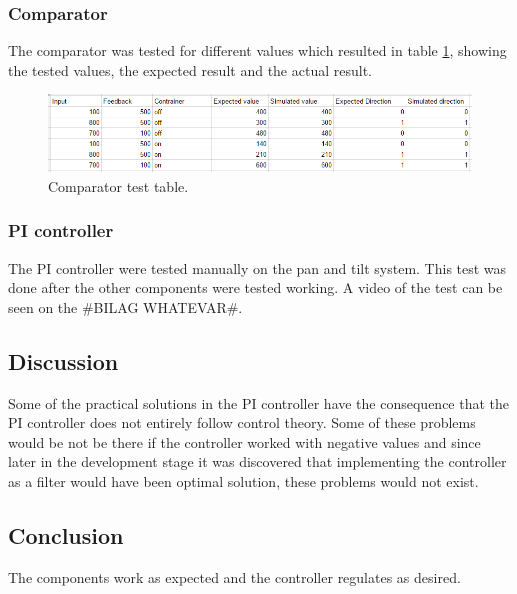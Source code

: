 \subsubsection{Comparator}

The comparator was tested for different values which resulted in table \ref{fig:Comparator_test_table}, showing the tested values, the expected result and the actual result.


\begin{figure}[h!]
\centering
\includegraphics[scale=0.7]{Billeder/FPGA/Comparator_test_table.png}
\caption{Comparator test table.}
\label{fig:Comparator_test_table}
\end{figure}


\subsubsection{PI controller}

The PI controller were tested manually on the pan and tilt system. This test was done after the other components were tested working. A video of the test can be seen on the \#BILAG WHATEVAR\#.


\subsection{Discussion}

Some of the practical solutions in the PI controller have the consequence that the PI controller does not entirely follow control theory. Some of these problems would be not be there if the controller worked with negative values and since later in the development stage it was discovered that implementing the controller as a filter would have been optimal solution, these problems would not exist.


\subsection{Conclusion}

The components work as expected and the controller regulates as desired.